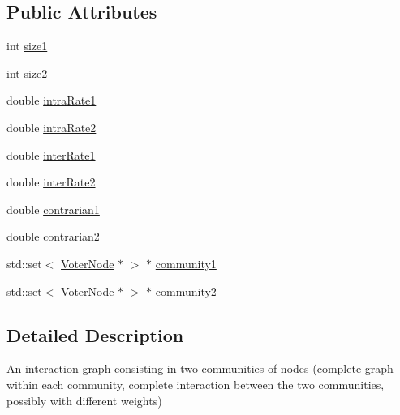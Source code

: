 \subsection*{Public Attributes}
\begin{DoxyCompactItemize}
\item 
int \hyperlink{class_two_communities_voter_graph_a3c9db0ac7e58d875ab3ce277bf74b284}{size1}
\item 
int \hyperlink{class_two_communities_voter_graph_a8b88457f020773b984e0d8c85d9ee502}{size2}
\item 
double \hyperlink{class_two_communities_voter_graph_a96a32ba7529177a7f6b73e827a57791e}{intra\-Rate1}
\item 
double \hyperlink{class_two_communities_voter_graph_a6e7ea06e014d75b7bf18441885e07e1e}{intra\-Rate2}
\item 
double \hyperlink{class_two_communities_voter_graph_af08c3b9a6e6f1dc8659a38ecd2d1afde}{inter\-Rate1}
\item 
double \hyperlink{class_two_communities_voter_graph_afab8bb5994f7fd1370d7d81caf7277d4}{inter\-Rate2}
\item 
double \hyperlink{class_two_communities_voter_graph_a883bf57bf07fb2e59f05df65df859a46}{contrarian1}
\item 
double \hyperlink{class_two_communities_voter_graph_a4274a05f5e2ceae57de1f0e71493b9a4}{contrarian2}
\item 
std\-::set$<$ \hyperlink{class_voter_node}{Voter\-Node} $\ast$ $>$ $\ast$ \hyperlink{class_two_communities_voter_graph_a354768f44c0a3daa6d0a70a20df77af5}{community1}
\item 
std\-::set$<$ \hyperlink{class_voter_node}{Voter\-Node} $\ast$ $>$ $\ast$ \hyperlink{class_two_communities_voter_graph_a7c918c6733474caa86bc2d217bd2cb4d}{community2}
\end{DoxyCompactItemize}


\subsection{Detailed Description}
An interaction graph consisting in two communities of nodes (complete graph within each community, complete interaction between the two communities, possibly with different weights) 

